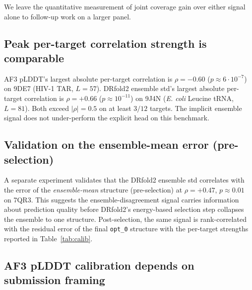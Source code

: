 \documentclass[conference,10pt]{IEEEtran}
\begin{document}
We leave the quantitative measurement of joint coverage gain over
either signal alone to follow-up work on a larger panel.

\subsection{Peak per-target correlation strength is comparable}

AF3 pLDDT's largest absolute per-target correlation is $\rho = -0.60$
($p \approx 6 \cdot 10^{-7}$) on 9DE7 (HIV-1 TAR, $L=57$).
DRfold2 ensemble std's largest absolute per-target correlation is
$\rho = +0.66$ ($p \approx 10^{-11}$) on 9J4N (\emph{E. coli} Leucine
tRNA, $L=81$). Both exceed $|\rho| = 0.5$ on at least
$3/12$ targets. The implicit ensemble signal does not under-perform
the explicit head on this benchmark.

\subsection{Validation on the ensemble-mean error (pre-selection)}

A separate experiment validates that the DRfold2 ensemble std
correlates with the error of the \emph{ensemble-mean} structure
(pre-selection) at $\rho = +0.47$, $p \approx 0.01$ on 7QR3. This
suggests the ensemble-disagreement signal carries information about
prediction quality before DRfold2's energy-based selection step
collapses the ensemble to one structure. Post-selection, the same
signal is rank-correlated with the residual error of the final
\texttt{opt\_0} structure with the per-target strengths reported in
Table~\ref{tab:calib}.

\subsection{AF3 pLDDT calibration depends on submission framing}
\label{sec:multichain}
\end{document}
